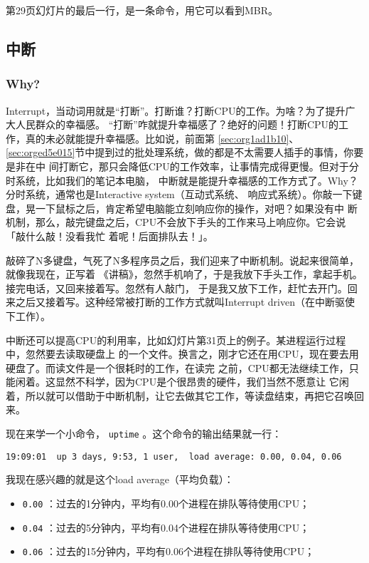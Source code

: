 \documentclass{wx672ctexart}
\newcommand\mpic[1]{%
  \marginpar{\texttt{[image: thumbnails/\#1]}}}
\begin{document}
第29页幻灯片的最后一行，是一条命令，用它可以看到MBR。

\subsection{中断}
\label{sec:org11b4f91}

\subsubsection{Why?}
\label{sec:org0bcee4f}

\mpic{pg_0031}Interrupt，当动词用就是“打断”。打断谁？打断CPU的工作。为啥？为了提升广大人民群众的幸福感。
“打断”咋就提升幸福感了？绝好的问题！打断CPU的工作，真的未必就能提升幸福感。比如说，前面第
\ref{sec:org1ad1b10}、\ref{sec:orged5e015}节中提到过的批处理系统，做的都是不太需要人插手的事情，你要是非在中
间打断它，那只会降低CPU的工作效率，让事情完成得更慢。但对于分时系统，比如我们的笔记本电脑，
中断就是能提升幸福感的工作方式了。Why？分时系统，通常也是Interactive system（互动式系统、
响应式系统）。你敲一下键盘，晃一下鼠标之后，肯定希望电脑能立刻响应你的操作，对吧？如果没有中
断机制，那么，敲完键盘之后，CPU不会放下手头的工作来马上响应你。它会说「敲什么敲！没看我忙
着呢！后面排队去！」。

敲碎了N多键盘，气死了N多程序员之后，我们迎来了中断机制。说起来很简单，就像我现在，正写着
《讲稿》，忽然手机响了，于是我放下手头工作，拿起手机。接完电话，又回来接着写。忽然有人敲门，
于是我又放下工作，赶忙去开门。回来之后又接着写。这种经常被打断的工作方式就叫Interrupt
driven（在中断驱使下工作）。

中断还可以提高CPU的利用率，比如幻灯片第31页上的例子。某进程运行过程中，忽然要去读取硬盘上
的一个文件。换言之，刚才它还在用CPU，现在要去用硬盘了。而读文件是一个很耗时的工作，在读完
之前，CPU都无法继续工作，只能闲着。这显然不科学，因为CPU是个很昂贵的硬件，我们当然不愿意让
它闲着，所以就可以借助于中断机制，让它去做其它工作，等读盘结束，再把它召唤回来。

现在来学一个小命令， \texttt{uptime} 。这个命令的输出结果就一行：
\begin{verbatim}
19:09:01  up 3 days, 9:53, 1 user,  load average: 0.00, 0.04, 0.06
\end{verbatim}

我现在感兴趣的就是这个load average（平均负载）：
\begin{itemize}
\item \texttt{0.00} ：过去的1分钟内，平均有0.00个进程在排队等待使用CPU；
\item \texttt{0.04} ：过去的5分钟内，平均有0.04个进程在排队等待使用CPU；
\item \texttt{0.06} ：过去的15分钟内，平均有0.06个进程在排队等待使用CPU；
\end{itemize}
\end{document}
